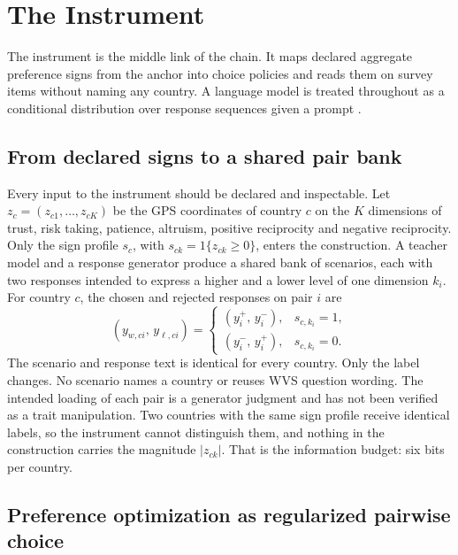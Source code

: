 \section{The Instrument}\label{sec:instrument}

The instrument is the middle link of the chain. It maps declared aggregate preference signs from the anchor into choice policies and reads them on survey items without naming any country. A language model is treated throughout as a conditional distribution over response sequences given a prompt \citep{ludwig2026}.

\subsection{From declared signs to a shared pair bank}

Every input to the instrument should be declared and inspectable. Let $z_c=(z_{c1},\ldots,z_{cK})$ be the GPS coordinates of country $c$ on the $K$ dimensions of trust, risk taking, patience, altruism, positive reciprocity and negative reciprocity. Only the sign profile $s_c$, with $s_{ck}=1\{z_{ck}\geq 0\}$, enters the construction. A teacher model and a response generator produce a shared bank of scenarios, each with two responses intended to express a higher and a lower level of one dimension $k_i$. For country $c$, the chosen and rejected responses on pair $i$ are
\begin{equation}
(y_{w,ci},\,y_{\ell,ci})=\begin{cases}(y_i^{+},\,y_i^{-}), & s_{c,k_i}=1,\\ (y_i^{-},\,y_i^{+}), & s_{c,k_i}=0.\end{cases}
\label{eq:sign_rule}
\end{equation}
The scenario and response text is identical for every country. Only the label changes. No scenario names a country or reuses WVS question wording. The intended loading of each pair is a generator judgment and has not been verified as a trait manipulation. Two countries with the same sign profile receive identical labels, so the instrument cannot distinguish them, and nothing in the construction carries the magnitude $|z_{ck}|$. That is the information budget: six bits per country.

\subsection{Preference optimization as regularized pairwise choice}

